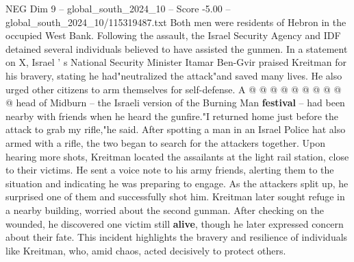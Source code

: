 \begin{textsample}{NEG Dim 9 – global\_south\_2024\_10 – Score -5.00 – global\_south\_2024\_10/115319487.txt}
Both men were residents of Hebron in the occupied West Bank.
Following the assault, the Israel Security Agency and IDF detained several individuals believed to have assisted the gunmen.
In a statement on X, Israel ' s National Security Minister Itamar Ben-Gvir praised Kreitman for his bravery, stating he had"neutralized the attack"and saved many lives.
He also urged other citizens to arm themselves for self-defense.
A @ @ @ @ @ @ @ @ @ @ head of Midburn -- the Israeli version of the Burning Man \textbf{festival} -- had been nearby with friends when he heard the gunfire."I returned home just before the attack to grab my rifle,"he said.
After spotting a man in an Israel Police hat also armed with a rifle, the two began to search for the attackers together.
Upon hearing more shots, Kreitman located the assailants at the light rail station, close to their victims.
He sent a voice note to his army friends, alerting them to the situation and indicating he was preparing to engage.
As the attackers split up, he surprised one of them and successfully shot him.
Kreitman later sought refuge in a nearby building, worried about the second gunman.
After checking on the wounded, he discovered one victim still \textbf{alive}, though he later expressed concern about their fate.
This incident highlights the bravery and resilience of individuals like Kreitman, who, amid chaos, acted decisively to protect others.

\end{textsample}

